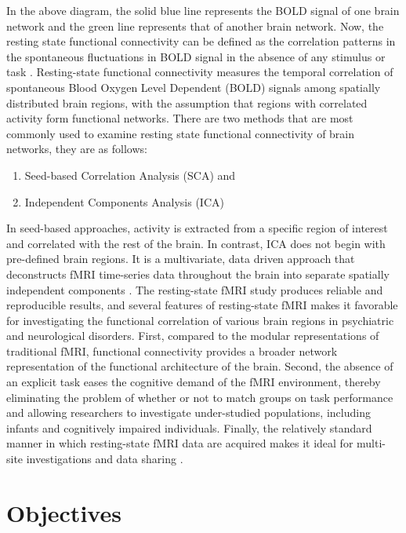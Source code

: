﻿\documentclass[12pt]{article}
\begin{document}
In the above diagram, the solid blue line represents the BOLD signal
of one brain network and the green line represents that of
another brain network. Now, the resting state functional connectivity
can be defined as the correlation patterns in the spontaneous
fluctuations in BOLD signal in the absence of any stimulus or task
\cite{frontiers:rsfc}. Resting-state functional connectivity measures
the temporal correlation of spontaneous Blood Oxygen Level Dependent
(BOLD) signals among spatially distributed brain regions, with the
assumption that regions with correlated activity form functional
networks. There are two methods that are most commonly used to examine
resting state functional connectivity of brain networks, they are as
follows:

\begin{enumerate}[nosep]
  \item Seed-based Correlation Analysis (SCA) and
  \item Independent Components Analysis (ICA)
\end{enumerate}

In seed-based approaches, activity is extracted from a specific region
of interest and correlated with the rest of the brain. In contrast,
ICA does not begin with pre-defined brain regions. It is
a multivariate, data driven approach that deconstructs fMRI
time-series data throughout the brain into separate spatially
independent components \cite{connectivityanalysis}. The resting-state
fMRI study produces reliable and reproducible results, and several
features of resting-state fMRI makes it favorable for investigating
the functional correlation of various brain regions in psychiatric and
neurological disorders. First, compared to the modular representations
of traditional fMRI, functional connectivity provides a broader
network representation of the functional architecture of the
brain. Second, the absence of an explicit task eases the cognitive
demand of the fMRI environment, thereby eliminating the problem of
whether or not to match groups on task performance and allowing
researchers to investigate under-studied populations, including
infants and cognitively impaired individuals. Finally, the relatively
standard manner in which resting-state fMRI data are acquired makes it
ideal for multi-site investigations and data sharing \cite{resting}.

\newpage

\section{Objectives}
\end{document}
